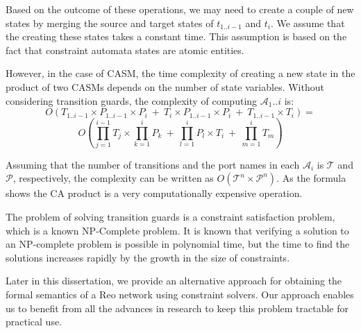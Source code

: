 Based on the outcome of these operations, we may need to create a couple of new states by merging the source and target states of $t_{1..i-1}$ and $t_i$. We assume that the creating these states takes a constant time. This assumption is based on the fact that constraint automata states are atomic entities. 

However, in the case of CASM, the time complexity of creating a new state in the product of two CASMs depends on the number of state variables. Without considering transition guards, the complexity of computing $\mathcal{A}_1..i$ is:
$$O(T_{1..i-1} \times P_{1..i-1} \times P_i\ +\ T_{i} \times P_{1..i-1} \times P_i \ + \ T_{1..i-1} \times T_{i}) = $$
$$O(\prod_{j=1}^{i-1} T_{j} \times \prod_{k=1}^{i} P_{k} \ +\ \prod_{l=1}^{i} P_{l} \times T_{i} \ + \ \prod_{m=1}^{i} T_{m}) $$

Assuming that the number of transitions and the port names in each $\mathcal{A}_i$ is $\mathcal{T}$ and  %
 $\mathcal{P}$, respectively,
 the complexity can be written as $O(\mathcal{T}^{n} \times \mathcal{P}^n).$ As the formula shows the CA product is a very computationally expensive operation.  

The problem of solving transition guards is a constraint satisfaction problem, which is a known NP-Complete problem. It is known that  verifying a solution to an NP-complete problem is possible in polynomial time, but the time to find the solutions increases rapidly by the growth in the size of constraints. 

Later in this dissertation, we provide an alternative approach for obtaining the formal semantics of a Reo network using constraint solvers.
Our approach enables us to benefit from all the advances in research to keep this problem tractable for practical use.
